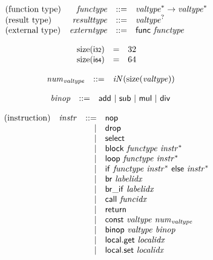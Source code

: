 \documentclass{article}
\begin{document}
$$
\begin{array}{@{}lrrl@{}l@{}}
	\mbox{(function type)} & {\mathit{functype}} &::=& {{\mathit{valtype}}^\ast} \rightarrow {{\mathit{valtype}}^\ast} \\
	\mbox{(result type)} & {\mathit{resulttype}} &::=& {{\mathit{valtype}}^?} \\
	\mbox{(external type)} & {\mathit{externtype}} &::=& \mathsf{func}~{\mathit{functype}} \\
\end{array}
$$

\vspace{1ex}

$$
\begin{array}{@{}lcl@{}l@{}}
	{\mathrm{size}}(\mathsf{i{\scriptstyle 32}}) &=& 32 \\
	{\mathrm{size}}(\mathsf{i{\scriptstyle 64}}) &=& 64 \\
\end{array}
$$

$$
\begin{array}{@{}lrrl@{}l@{}}
	& {{\mathit{num}}}_{{\mathit{valtype}}} &::=& {\mathit{iN}}({\mathrm{size}}({\mathit{valtype}})) \\
\end{array}
$$

\vspace{1ex}

$$
\begin{array}{@{}lrrl@{}l@{}}
	& {\mathit{binop}} &::=& \mathsf{add} ~|~ \mathsf{sub} ~|~ \mathsf{mul} ~|~ \mathsf{div} \\
\end{array}
$$

\vspace{1ex}

$$
\begin{array}{@{}lrrl@{}l@{}}
	\mbox{(instruction)} & {\mathit{instr}} &::=& \mathsf{nop} \\ &&|&
	\mathsf{drop} \\ &&|&
	\mathsf{select} \\ &&|&
	\mathsf{block}~{\mathit{functype}}~{{\mathit{instr}}^\ast} \\ &&|&
	\mathsf{loop}~{\mathit{functype}}~{{\mathit{instr}}^\ast} \\ &&|&
	\mathsf{if}~{\mathit{functype}}~{{\mathit{instr}}^\ast}~\mathsf{else}~{{\mathit{instr}}^\ast} \\ &&|&
	\mathsf{br}~{\mathit{labelidx}} \\ &&|&
	\mathsf{br\_if}~{\mathit{labelidx}} \\ &&|&
	\mathsf{call}~{\mathit{funcidx}} \\ &&|&
	\mathsf{return} \\ &&|&
	\mathsf{const}~{\mathit{valtype}}~{{\mathit{num}}}_{{\mathit{valtype}}} \\ &&|&
	\mathsf{binop}~{\mathit{valtype}}~{\mathit{binop}} \\ &&|&
	\mathsf{local.get}~{\mathit{localidx}} \\ &&|&
	\mathsf{local.set}~{\mathit{localidx}} \\
\end{array}
$$
\end{document}

